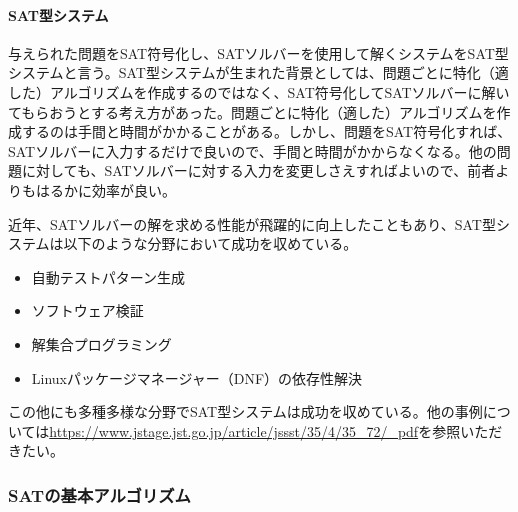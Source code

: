 \documentclass[dvipdfmx]{jsarticle}
\begin{document}
\paragraph{SAT型システム}
与えられた問題をSAT符号化し、SATソルバーを使用して解くシステムをSAT型システムと言う。SAT型システムが生まれた背景としては、問題ごとに特化（適した）アルゴリズムを作成するのではなく、SAT符号化してSATソルバーに解いてもらおうとする考え方があった。問題ごとに特化（適した）アルゴリズムを作成するのは手間と時間がかかることがある。しかし、問題をSAT符号化すれば、SATソルバーに入力するだけで良いので、手間と時間がかからなくなる。他の問題に対しても、SATソルバーに対する入力を変更しさえすればよいので、前者よりもはるかに効率が良い。\par
近年、SATソルバーの解を求める性能が飛躍的に向上したこともあり、SAT型システムは以下のような分野において成功を収めている。
\begin{itemize}
  \item 自動テストパターン生成
  \item ソフトウェア検証
  \item 解集合プログラミング
  \item Linuxパッケージマネージャー（DNF）の依存性解決
\end{itemize}
この他にも多種多様な分野でSAT型システムは成功を収めている。他の事例については\url{https://www.jstage.jst.go.jp/article/jssst/35/4/35_72/_pdf}を参照いただきたい。
\subsubsection{SATの基本アルゴリズム}
\end{document}
